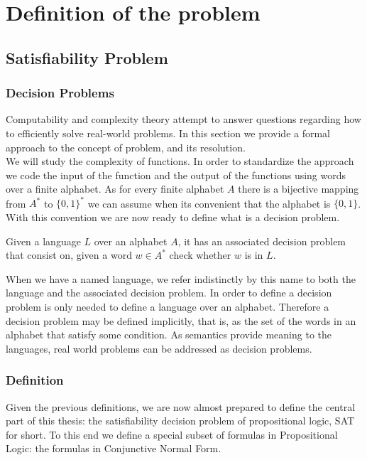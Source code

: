 \chapter{Definition of the problem}
\section{Satisfiability Problem}
\subsection{Decision Problems}
Computability and complexity theory attempt to answer questions regarding how to efficiently solve real-world problems. In this section we provide a formal approach to the concept of problem, and its resolution.\\

We will study the complexity of functions. In order to standardize the approach we code the input of the function and the output of the functions using words over a finite alphabet. As for every finite alphabet $A$ there is a bijective mapping from $A^*$ to $\{0,1\}^*$ we can assume when its convenient that the alphabet is $\{0,1\}$. With this convention we are now ready to define what is a decision problem.

\begin{definition}
  Given a language $L$ over an alphabet $A$, it has an associated decision problem that consist on, given a word $w\in A^*$ check whether $w$ is in $L$. 	
\end{definition}


When we have a named language, we refer indistinctly by this name to both the language and the associated decision problem. In order to define a decision problem is only needed to define a language over an alphabet. Therefore a decision problem may be defined implicitly, that is, as the set of the words in an alphabet that satisfy some condition. As semantics provide meaning to the languages, real world problems can be addressed as decision problems.


\subsection{Definition}

Given the previous definitions, we are now almost prepared to define the central part of this thesis: the satisfiability decision problem of propositional logic, SAT for short. To this end we define a special subset of formulas in Propositional Logic: the formulas in Conjunctive Normal Form.


